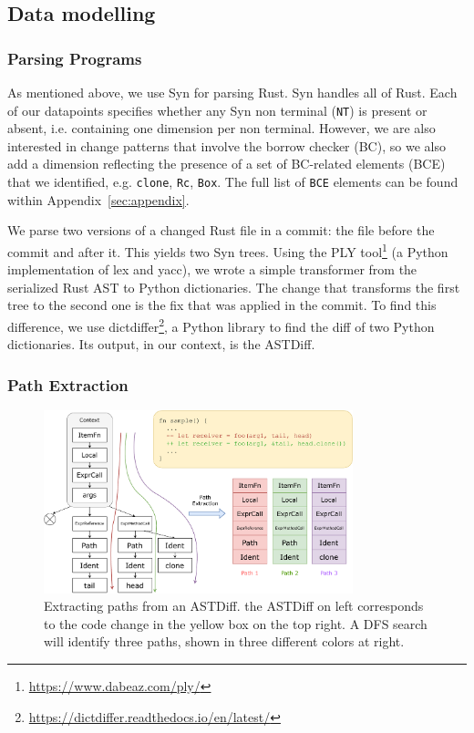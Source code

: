 \subsection{\label{sec:data_modelling}Data modelling}

\subsubsection{\label{sec:parsing_programs}Parsing Programs}

As mentioned above, we use Syn for parsing Rust. Syn handles all of Rust. Each of our datapoints specifies whether any Syn non terminal (\texttt{NT}) is present or absent, i.e. containing one dimension per non terminal. However, we are also interested in change patterns that involve the borrow checker (BC), so we also add a dimension reflecting the presence of a set of BC-related elements (BCE) that we identified, e.g. \texttt{clone}, \texttt{Rc}, \texttt{Box}. The full list of \verb+BCE+ elements can be found within Appendix~\ref{sec:appendix}.

We parse two versions of a changed Rust file in a commit: the file before the commit and after it. This yields two Syn trees. Using the PLY tool\footnote{\url{https://www.dabeaz.com/ply/}} (a Python implementation of lex and yacc), we wrote a simple transformer from the serialized Rust AST to Python dictionaries. The change that transforms the first tree to the second one is the fix that was applied in the commit. To find this difference, we use dictdiffer\footnote{\url{https://dictdiffer.readthedocs.io/en/latest/}}, a Python library to find the diff of two Python dictionaries. Its output, in our context, is the ASTDiff.

\subsubsection{\label{sec:path_extraction}Path Extraction}

\begin{figure}[h]
\centering
\includegraphics[width=0.8\textwidth]{figs/extraction.drawio.pdf}
\caption{\label{fig:extraction}Extracting paths from an ASTDiff. the ASTDiff on left corresponds to the code change in the yellow box on the top right. A DFS search will identify three paths, shown in three different colors at right.}
\end{figure}


